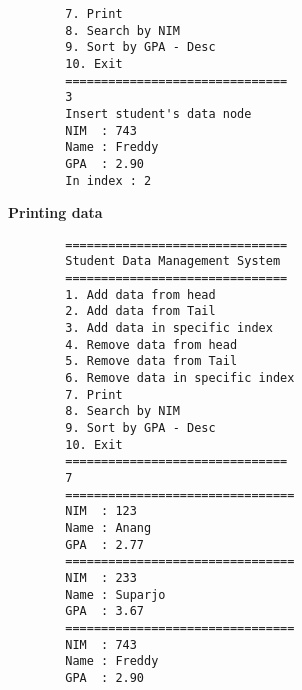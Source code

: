 \documentclass[12pt,titlepage]{article}
\begin{document}
\begin{enumerate}
\begin{verbatim}
        7. Print
        8. Search by NIM
        9. Sort by GPA - Desc
        10. Exit
        ===============================
        3
        Insert student's data node
        NIM  : 743
        Name : Freddy
        GPA  : 2.90
        In index : 2
    \end{verbatim}
    \textbf{Printing data}
    \begin{verbatim}
        =============================== 
        Student Data Management System
        ===============================
        1. Add data from head
        2. Add data from Tail
        3. Add data in specific index
        4. Remove data from head
        5. Remove data from Tail
        6. Remove data in specific index
        7. Print
        8. Search by NIM
        9. Sort by GPA - Desc
        10. Exit
        ===============================
        7
        ================================
        NIM  : 123
        Name : Anang
        GPA  : 2.77
        ================================
        NIM  : 233
        Name : Suparjo
        GPA  : 3.67
        ================================
        NIM  : 743
        Name : Freddy
        GPA  : 2.90


\end{verbatim}
\end{enumerate}
\end{document}
